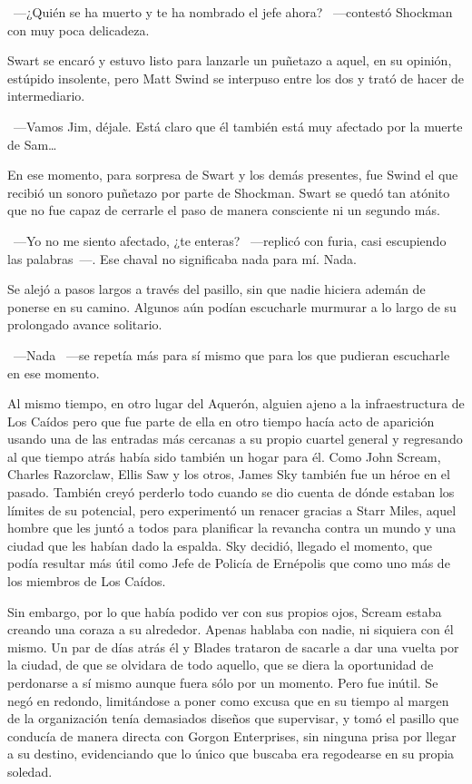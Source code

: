 ~---¿Quién se ha muerto y te ha nombrado el jefe ahora? ~---contestó Shockman con muy poca delicadeza.

Swart se encaró y estuvo listo para lanzarle un puñetazo a aquel, en su opinión, estúpido insolente, pero Matt Swind se interpuso entre los dos y trató de hacer de intermediario.

~---Vamos Jim, déjale. Está claro que él también está muy afectado por la muerte de Sam…

En ese momento, para sorpresa de Swart y los demás presentes, fue Swind el que recibió un sonoro puñetazo por parte de Shockman. Swart se quedó tan atónito que no fue capaz de cerrarle el paso de manera consciente ni un segundo más.

~---Yo no me siento afectado, ¿te enteras? ~---replicó con furia, casi escupiendo las palabras~---. Ese chaval no significaba nada para mí. Nada.

Se alejó a pasos largos a través del pasillo, sin que nadie hiciera ademán de ponerse en su camino. Algunos aún podían escucharle murmurar a lo largo de su prolongado avance solitario.

~---Nada ~---se repetía más para sí mismo que para los que pudieran escucharle en ese momento.

\parbreak
Al mismo tiempo, en otro lugar del Aquerón, alguien ajeno a la infraestructura de Los Caídos pero que fue parte de ella en otro tiempo hacía acto de aparición usando una de las entradas más cercanas a su propio cuartel general y regresando al que tiempo atrás había sido también un hogar para él. Como John Scream, Charles Razorclaw, Ellis Saw y los otros, James Sky también fue un héroe en el pasado. También creyó perderlo todo cuando se dio cuenta de dónde estaban los límites de su potencial, pero experimentó un renacer gracias a Starr Miles, aquel hombre que les juntó a todos para planificar la revancha contra un mundo y una ciudad que les habían dado la espalda. Sky decidió, llegado el momento, que podía resultar más útil como Jefe de Policía de Ernépolis que como uno más de los miembros de Los Caídos.

Sin embargo, por lo que había podido ver con sus propios ojos, Scream estaba creando una coraza a su alrededor. Apenas hablaba con nadie, ni siquiera con él mismo. Un par de días atrás él y Blades trataron de sacarle a dar una vuelta por la ciudad, de que se olvidara de todo aquello, que se diera la oportunidad de perdonarse a sí mismo aunque fuera sólo por un momento. Pero fue inútil. Se negó en redondo, limitándose a poner como excusa que en su tiempo al margen de la organización tenía demasiados diseños que supervisar, y tomó el pasillo que conducía de manera directa con Gorgon Enterprises, sin ninguna prisa por llegar a su destino, evidenciando que lo único que buscaba era regodearse en su propia soledad.

